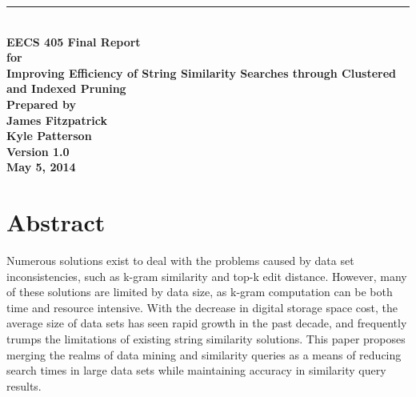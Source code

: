 \documentclass[pdftex,12pt,letter]{article}
\newcommand{\HRule}{\rule{\linewidth}{0.5mm}}
\begin{document}
\begin{titlepage}
\begin{flushright}
\HRule \\[0.4cm]
{ \bfseries
{\huge EECS 405 Final Report\\[1cm]}
{\Large for\\[1cm]}
{\large Improving Efficiency of String Similarity Searches through Clustered and Indexed Pruning\\[3cm]}
{\large Prepared by\\[1cm]James Fitzpatrick\\Kyle Patterson\\[2cm]
Version 1.0\\
May 5, 2014\\
}}
\end{flushright}
\end{titlepage}

\tableofcontents\newpage

\section{Abstract}
Numerous solutions exist to deal with the problems caused by data set inconsistencies, such as k-gram similarity and top-k edit distance. However, many of these solutions are limited by data size, as k-gram computation can be both time and resource intensive. With the decrease in digital storage space cost, the average size of data sets has seen rapid growth in the past decade, and frequently trumps the limitations of existing string similarity solutions. This paper proposes merging the realms of data mining and similarity queries as a means of reducing search times in large data sets while maintaining accuracy in similarity query results.
\end{document}
